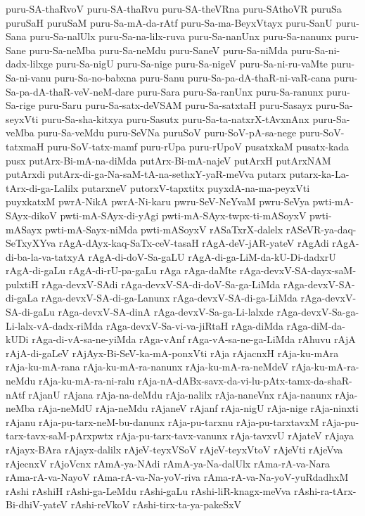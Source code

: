 {puru-SA-thaRvoV
puru-SA-thaRvu
puru-SA-theVRna
puru-SAthoVR
puruSa
puruSaH
puruSaM
puru-Sa-mA-da-rAtf
puru-Sa-ma-BeyxVtayx
puru-SanU
puru-Sana
puru-Sa-nalUlx
puru-Sa-na-lilx-ruva
puru-Sa-nanUnx
puru-Sa-nanunx
puru-Sane
puru-Sa-neMba
puru-Sa-neMdu
puru-SaneV
puru-Sa-niMda
puru-Sa-ni-dadx-lilxge
puru-Sa-nigU
puru-Sa-nige
puru-Sa-nigeV
puru-Sa-ni-ru-vaMte
puru-Sa-ni-vanu
puru-Sa-no-babxna
puru-Sanu
puru-Sa-pa-dA-thaR-ni-vaR-cana
puru-Sa-pa-dA-thaR-veV-neM-dare
puru-Sara
puru-Sa-ranUnx
puru-Sa-ranunx
puru-Sa-rige
puru-Saru
puru-Sa-satx-deVSAM
puru-Sa-satxtaH
puru-Sasayx
puru-Sa-seyxVti
puru-Sa-sha-kitxya
puru-Sasutx
puru-Sa-ta-natxrX-tAvxnAnx
puru-Sa-veMba
puru-Sa-veMdu
puru-SeVNa
puruSoV
puru-SoV-pA-sa-nege
puru-SoV-tatxmaH
puru-SoV-tatx-mamf
puru-rUpa
puru-rUpoV
pusatxkaM
pusatx-kada
pusx
putArx-Bi-mA-na-diMda
putArx-Bi-mA-najeV
putArxH
putArxNAM
putArxdi
putArx-di-ga-Na-saM-tA-na-sethxY-yaR-meVva
putarx
putarx-ka-La-tArx-di-ga-Lalilx
putarxneV
putorxV-tapxtitx
puyxdA-na-ma-peyxVti
puyxkatxM
pwrA-NikA
pwrA-Ni-karu
pwru-SeV-NeYvaM
pwru-SeVya
pwti-mA-SAyx-dikoV
pwti-mA-SAyx-di-yAgi
pwti-mA-SAyx-twpx-ti-mASoyxV
pwti-mASayx
pwti-mA-Sayx-niMda
pwti-mASoyxV
rASaTxrX-dalelx
rASeVR-ya-daq-SeTxyXYva
rAgA-dAyx-kaq-SaTx-ceV-tasaH
rAgA-deV-jAR-yateV
rAgAdi
rAgA-di-ba-la-va-tatxyA
rAgA-di-doV-Sa-gaLU
rAgA-di-ga-LiM-da-kU-Di-dadxrU
rAgA-di-gaLu
rAgA-di-rU-pa-gaLu
rAga
rAga-daMte
rAga-devxV-SA-dayx-saM-pulxtiH
rAga-devxV-SAdi
rAga-devxV-SA-di-doV-Sa-ga-LiMda
rAga-devxV-SA-di-gaLa
rAga-devxV-SA-di-ga-Lanunx
rAga-devxV-SA-di-ga-LiMda
rAga-devxV-SA-di-gaLu
rAga-devxV-SA-dinA
rAga-devxV-Sa-ga-Li-lalxde
rAga-devxV-Sa-ga-Li-lalx-vA-dadx-riMda
rAga-devxV-Sa-vi-va-jiRtaH
rAga-diMda
rAga-diM-da-kUDi
rAga-di-vA-sa-ne-yiMda
rAga-vAnf
rAga-vA-sa-ne-ga-LiMda
rAhuvu
rAjA
rAjA-di-gaLeV
rAjAyx-Bi-SeV-ka-mA-ponxVti
rAja
rAjacnxH
rAja-ku-mAra
rAja-ku-mA-rana
rAja-ku-mA-ra-nanunx
rAja-ku-mA-ra-neMdeV
rAja-ku-mA-ra-neMdu
rAja-ku-mA-ra-ni-ralu
rAja-nA-dABx-savx-da-vi-lu-pAtx-tamx-da-shaR-nAtf
rAjanU
rAjana
rAja-na-deMdu
rAja-nalilx
rAja-naneVnx
rAja-nanunx
rAja-neMba
rAja-neMdU
rAja-neMdu
rAjaneV
rAjanf
rAja-nigU
rAja-nige
rAja-ninxti
rAjanu
rAja-pu-tarx-neM-bu-danunx
rAja-pu-tarxnu
rAja-pu-tarxtavxM
rAja-pu-tarx-tavx-saM-pArxpwtx
rAja-pu-tarx-tavx-vanunx
rAja-tavxvU
rAjateV
rAjaya
rAjayx-BAra
rAjayx-dalilx
rAjeV-teyxVSoV
rAjeV-teyxVtoV
rAjeVti
rAjeVva
rAjecnxV
rAjoVcnx
rAmA-ya-NAdi
rAmA-ya-Na-dalUlx
rAma-rA-va-Nara
rAma-rA-va-NayoV
rAma-rA-va-Na-yoV-riva
rAma-rA-va-Na-yoV-yuRdadhxM
rAshi
rAshiH
rAshi-ga-LeMdu
rAshi-gaLu
rAshi-liR-knagx-meVva
rAshi-ra-tArx-Bi-dhiV-yateV
rAshi-reVkoV
rAshi-tirx-ta-ya-pakeSxV
}
